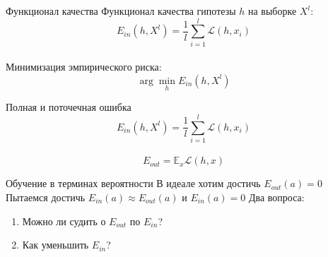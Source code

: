 \documentclass[10pt]{beamer}
\begin{document}
{
\begin{frame}{Функционал качества}
  Функционал качества гипотезы $h$ на выборке $X^l$:\\
  $$E_{in}(h, X^l) = \frac{1}{l} \sum\limits_{i=1}^l \mathcal{L}(h, x_i)$$\\
  Минимизация эмпирического риска:\\
  $$\arg\min\limits_{h} E_{in}(h, X^l)$$
\end{frame}
}

\begin{frame}{Полная и поточечная ошибка}  
  $$E_{in}(h, X^l) = \frac{1}{l} \sum\limits_{i=1}^l \mathcal{L}(h, x_i)$$\\
  \bigbreak
  $$E_{out} = \mathbb{E}_x \mathcal{L}(h, x) $$
\end{frame}

%

\begin{frame}{Обучение в терминах вероятности}  
  В идеале хотим достичь $E_{out}(a) = 0$\\
  \bigbreak
  Пытаемся достичь $E_{in}(a) \approx E_{out}(a)$ и $E_{in}(a) = 0$
  \bigbreak
  \pause
  Два вопроса:\\
  \begin{enumerate}
    \item Можно ли судить о $E_{out}$ по $E_{in}$?
    \item Как уменьшить $E_{in}$?
  \end{enumerate}
\end{frame}
\end{document}

